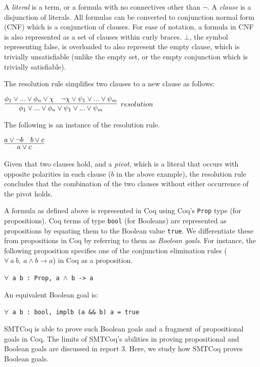\documentclass{article}
\begin{document}
	A \textit{literal} is a term, or a 
	formula with no connectives other than 
	$\neg$. A \textit{clause} is a 
	disjunction of literals. All formulas 
	can be converted to conjunction normal 
	form (CNF) which is a conjunction of 
	clauses. For ease of notation, 
	a formula in CNF is also represented
	as a set of clauses within curly 
	braces. $\bot$, the symbol
	representing false, 
	is overloaded to also represent
	the empty clause, which is trivially
	unsatisfiable (unlike the empty set,
	or the empty conjunction which is 
	trivially satisfiable).
	
	\noindent The resolution rule simplifies two 
	clauses to a new clause as follows:
	\begin{center}
		$\infer[resolution]{\phi_1 \lor ... \lor 
			\phi_n \lor \psi_1 \lor ... \lor 
			\psi_m}{\phi_1 \lor ... \lor \phi_n 
			\lor \chi & \neg \chi \lor \psi_1 
			\lor ... \lor \psi_m}$ 
	\end{center}
	The following is an instance of the 
	resolution rule.
	\begin{center}
		$\infer{a \lor c}{a \lor \neg b 
			& b \lor c}$
	\end{center}
	Given that two clauses hold, 
	and a \textit{pivot}, which is a 
	literal that occurs with opposite 
	polarities in each clause ($b$ in 
	the above example), the resolution 
	rule concludes that 
	the combination of the two clauses 
	without either occurrence of the 
	pivot holds.
	
	A formula as defined above is 
	represented in Coq using Coq's
	\texttt{Prop} type (for 
	propositions). Coq terms 
	of type \texttt{bool} (for 
	Booleans) are represented as 
	propositions by equating them 
	to the Boolean value \texttt{true}.
	We differentiate these from 
	propositions in Coq by referring to 
	them as \textit{Boolean goals}.
	For instance, the following 
	proposition specifies one of the 
	conjunction elimination rules
	($\forall\ a\ b,\ a \land b \to a$) in 
	Coq as a proposition.
	\begin{center}
		\texttt{$\forall$ a b : Prop,
			a $\land$ b -> a}
	\end{center}
	An equivalent Boolean goal is:
	\begin{center}
		\texttt{$\forall$ a b : bool,
			implb (a \&\& b) a = true}
	\end{center}
	SMTCoq is able to prove such Boolean 
	goals and a fragment of propositional
	goals in Coq. The limits of SMTCoq's 
	abilities in proving propositional and 
	Boolean goals are discussed in report 3. 
	Here, we study how SMTCoq proves Boolean 
	goals. 
	
\end{document}
